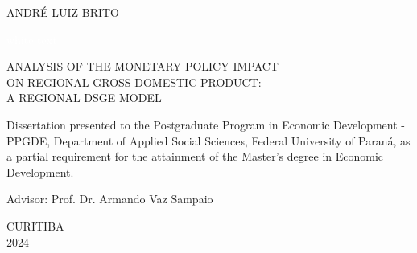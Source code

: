\documentclass[../thesis.tex]{subfiles}
\begin{document}
	
	\begin{center}
					
			
	ANDRÉ LUIZ BRITO
			
	\vspace*{2cm}
			
	\textcolor{white}{white text}
			
	\vspace*{5cm}
			
	ANALYSIS OF THE MONETARY POLICY IMPACT \\
	ON REGIONAL GROSS DOMESTIC PRODUCT: \\
	A REGIONAL DSGE MODEL

	\vspace*{1cm}

	\begin{adjustwidth}{8cm}{0pt}

	\begin{singlespace}		

	\begin{justify}
		
	\sloppy \fontsize{10}{10}\selectfont Dissertation presented to the Postgraduate Program in Economic Development - PPGDE, Department of Applied Social Sciences, Federal University of Paraná, as a partial requirement for the attainment of the Master's degree in Economic Development.
		
	\end{justify}
	
	\end{singlespace}
							
		\fontsize{10}{10}\selectfont Advisor: Prof. Dr. Armando Vaz Sampaio
			
							
	\end{adjustwidth}

	\vfill
			
	CURITIBA \\	
	2024
			
	\vspace*{1cm}
	
	\end{center}
	
	\thispagestyle{empty}
	
	\newpage
	
\end{document}
